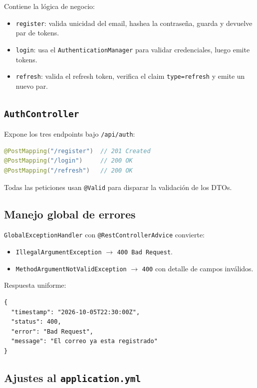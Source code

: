 Contiene la lógica de negocio:

\begin{itemize}[leftmargin=*]
  \item \texttt{register}: valida unicidad del email, hashea la contraseña, guarda y devuelve par de tokens.
  \item \texttt{login}: usa el \texttt{AuthenticationManager} para validar credenciales, luego emite tokens.
  \item \texttt{refresh}: valida el refresh token, verifica el claim \texttt{type=refresh} y emite un nuevo par.
\end{itemize}

\subsection{\texttt{AuthController}}

Expone los tres endpoints bajo \texttt{/api/auth}:

\begin{lstlisting}[language=java]
@PostMapping("/register")  // 201 Created
@PostMapping("/login")     // 200 OK
@PostMapping("/refresh")   // 200 OK
\end{lstlisting}

Todas las peticiones usan \texttt{@Valid} para disparar la validación de los DTOs.

\subsection{Manejo global de errores}

\texttt{GlobalExceptionHandler} con \texttt{@RestControllerAdvice} convierte:

\begin{itemize}[leftmargin=*]
  \item \texttt{IllegalArgumentException} $\rightarrow$ \texttt{400 Bad Request}.
  \item \texttt{MethodArgumentNotValidException} $\rightarrow$ \texttt{400} con detalle de campos inválidos.
\end{itemize}

Respuesta uniforme:

\begin{lstlisting}
{
  "timestamp": "2026-10-05T22:30:00Z",
  "status": 400,
  "error": "Bad Request",
  "message": "El correo ya esta registrado"
}
\end{lstlisting}

\subsection{Ajustes al \texttt{application.yml}}

